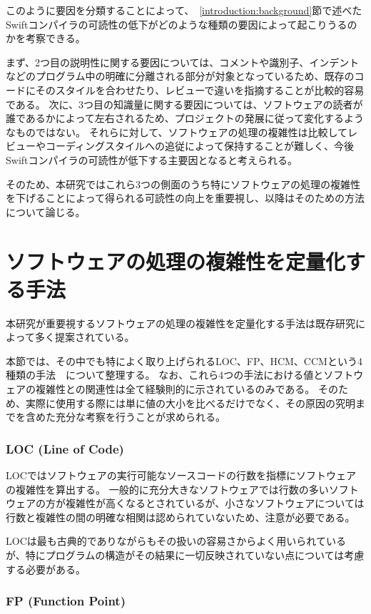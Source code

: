 このように要因を分類することによって、~\ref{introduction:background}節で述べたSwiftコンパイラの可読性の低下がどのような種類の要因によって起こりうるのかを考察できる。

まず、2つ目の説明性に関する要因については、コメントや識別子、インデントなどのプログラム中の明確に分離される部分が対象となっているため、既存のコードにそのスタイルを合わせたり、レビューで違いを指摘することが比較的容易である。
次に、3つ目の知識量に関する要因については、ソフトウェアの読者が誰であるかによって左右されるため、プロジェクトの発展に従って変化するようなものではない。
それらに対して、ソフトウェアの処理の複雑性は比較してレビューやコーディングスタイルへの追従によって保持することが難しく、今後Swiftコンパイラの可読性が低下する主要因となると考えられる。

そのため、本研究ではこれら3つの側面のうち特にソフトウェアの処理の複雑性を下げることによって得られる可読性の向上を重要視し、以降はそのための方法について論じる。


\section{ソフトウェアの処理の複雑性を定量化する手法}
\label{issue:method}

本研究が重要視するソフトウェアの処理の複雑性を定量化する手法は既存研究によって多く提案されている。

本節では、その中でも特によく取り上げられるLOC、FP、HCM、CCMという4種類の手法~\cite{yu}~\cite{symons}について整理する。
なお、これら4つの手法における値とソフトウェアの複雑性との関連性は全て経験則的に示されているのみである。
そのため、実際に使用する際には単に値の大小を比べるだけでなく、その原因の究明までを含めた充分な考察を行うことが求められる。

\subsubsection{LOC (Line of Code)}

LOCではソフトウェアの実行可能なソースコードの行数を指標にソフトウェアの複雑性を算出する。
一般的に充分大きなソフトウェアでは行数の多いソフトウェアの方が複雑性が高くなるとされているが、小さなソフトウェアについては行数と複雑性の間の明確な相関は認められていないため、注意が必要である。

LOCは最も古典的でありながらもその扱いの容易さからよく用いられているが、特にプログラムの構造がその結果に一切反映されていない点については考慮する必要がある。

\subsubsection{FP (Function Point)}

